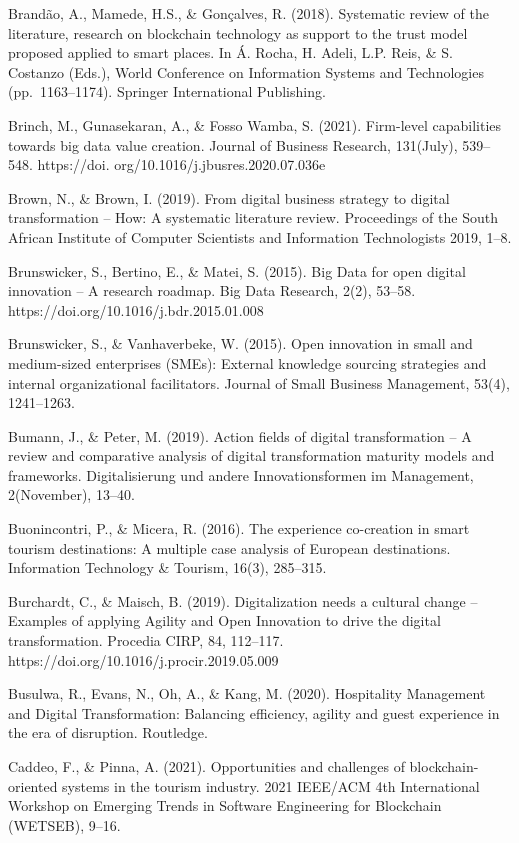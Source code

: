 \documentclass[
  letterpaper,
  DIV=11,
  numbers=noendperiod]{scrreprt}
\begin{document}
Brandão, A., Mamede, H.S., \& Gonçalves, R. (2018). Systematic review of
the literature, research on blockchain technology as support to the
trust model proposed applied to smart places. In Á. Rocha, H. Adeli,
L.P. Reis, \& S. Costanzo (Eds.), World Conference on Information
Systems and Technologies (pp.~1163--1174). Springer International
Publishing.

Brinch, M., Gunasekaran, A., \& Fosso Wamba, S. (2021). Firm-level
capabilities towards big data value creation. Journal of Business
Research, 131(July), 539--548. https://doi.
org/10.1016/j.jbusres.2020.07.036e

Brown, N., \& Brown, I. (2019). From digital business strategy to
digital transformation -- How: A systematic literature review.
Proceedings of the South African Institute of Computer Scientists and
Information Technologists 2019, 1--8.

Brunswicker, S., Bertino, E., \& Matei, S. (2015). Big Data for open
digital innovation -- A research roadmap. Big Data Research, 2(2),
53--58. https://doi.org/10.1016/j.bdr.2015.01.008

Brunswicker, S., \& Vanhaverbeke, W. (2015). Open innovation in small
and medium-sized enterprises (SMEs): External knowledge sourcing
strategies and internal organizational facilitators. Journal of Small
Business Management, 53(4), 1241--1263.

Bumann, J., \& Peter, M. (2019). Action fields of digital transformation
-- A review and comparative analysis of digital transformation maturity
models and frameworks. Digitalisierung und andere Innovationsformen im
Management, 2(November), 13--40.

Buonincontri, P., \& Micera, R. (2016). The experience co-creation in
smart tourism destinations: A multiple case analysis of European
destinations. Information Technology \& Tourism, 16(3), 285--315.

Burchardt, C., \& Maisch, B. (2019). Digitalization needs a cultural
change -- Examples of applying Agility and Open Innovation to drive the
digital transformation. Procedia CIRP, 84, 112--117.
https://doi.org/10.1016/j.procir.2019.05.009

Busulwa, R., Evans, N., Oh, A., \& Kang, M. (2020). Hospitality
Management and Digital Transformation: Balancing efficiency, agility and
guest experience in the era of disruption. Routledge.

Caddeo, F., \& Pinna, A. (2021). Opportunities and challenges of
blockchain-oriented systems in the tourism industry. 2021 IEEE/ACM 4th
International Workshop on Emerging Trends in Software Engineering for
Blockchain (WETSEB), 9--16.
\end{document}
